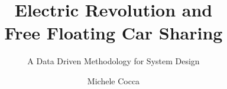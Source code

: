 \documentclass[%
   corpo=12pt, %
   oneside, %
   tipotesi=scudo,
   mybibliostyle, %
  numerazioneromana, %
   ]{toptesi}
\begin{document}
\begin{ThesisTitlePage}
\author{Michele Cocca}
\title{Electric Revolution and\\Free Floating Car Sharing}
\subtitle{A Data Driven Methodology for System Design}
%

\end{ThesisTitlePage}
\end{document}
